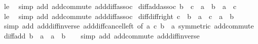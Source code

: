 \begin{isabellebody}
\ le\ \isamarkupfalse%
\ {\isacharparenleft}{\kern0pt}simp\ add{\isacharcolon}{\kern0pt}\ add{\isachardot}{\kern0pt}commute\ add{\isacharunderscore}{\kern0pt}diff{\isacharunderscore}{\kern0pt}assoc{\isacharparenright}{\kern0pt}%
\endisatagproof
{\isafoldproof}%
%
\isadelimproof
\isanewline
%
\endisadelimproof
\isanewline
{}\isamarkupfalse%
\ diff{\isacharunderscore}{\kern0pt}add{\isacharunderscore}{\kern0pt}assoc{}{\isacharcolon}{\kern0pt}\ {\isachardoublequoteopen}b\ {\isacharplus}{\kern0pt}\ c\ {\isacharminus}{\kern0pt}\ a\ {\isacharequal}{\kern0pt}\ b\ {\isacharminus}{\kern0pt}\ a\ {\isacharplus}{\kern0pt}\ c{\isachardoublequoteclose}\isanewline
%
\isadelimproof
\ \ %
\endisadelimproof
%
\isatagproof
{}\isamarkupfalse%
\ le\ \isamarkupfalse%
\ {\isacharparenleft}{\kern0pt}simp\ add{\isacharcolon}{\kern0pt}\ add{\isachardot}{\kern0pt}commute\ add{\isacharunderscore}{\kern0pt}diff{\isacharunderscore}{\kern0pt}assoc{\isacharparenright}{\kern0pt}%
\endisatagproof
{\isafoldproof}%
%
\isadelimproof
\isanewline
%
\endisadelimproof
\isanewline
{}\isamarkupfalse%
\ diff{\isacharunderscore}{\kern0pt}diff{\isacharunderscore}{\kern0pt}right{\isacharcolon}{\kern0pt}\ {\isachardoublequoteopen}c\ {\isacharminus}{\kern0pt}\ {\isacharparenleft}{\kern0pt}b\ {\isacharminus}{\kern0pt}\ a{\isacharparenright}{\kern0pt}\ {\isacharequal}{\kern0pt}\ c\ {\isacharplus}{\kern0pt}\ a\ {\isacharminus}{\kern0pt}\ b{\isachardoublequoteclose}\isanewline
%
\isadelimproof
\ \ %
\endisadelimproof
%
\isatagproof
{}\isamarkupfalse%
\ {\isacharparenleft}{\kern0pt}simp\ add{\isacharcolon}{\kern0pt}\ add{\isacharunderscore}{\kern0pt}diff{\isacharunderscore}{\kern0pt}inverse\ add{\isacharunderscore}{\kern0pt}diff{\isacharunderscore}{\kern0pt}cancel{\isacharunderscore}{\kern0pt}left\ {\isacharbrackleft}{\kern0pt}of\ a\ c\ {\isachardoublequoteopen}b\ {\isacharminus}{\kern0pt}\ a{\isachardoublequoteclose}{\isacharcomma}{\kern0pt}\ symmetric{\isacharbrackright}{\kern0pt}\ add{\isachardot}{\kern0pt}commute{\isacharparenright}{\kern0pt}%
\endisatagproof
{\isafoldproof}%
%
\isadelimproof
\isanewline
%
\endisadelimproof
\isanewline
{}\isamarkupfalse%
\ diff{\isacharunderscore}{\kern0pt}add{\isacharcolon}{\kern0pt}\ {\isachardoublequoteopen}b\ {\isacharminus}{\kern0pt}\ a\ {\isacharplus}{\kern0pt}\ a\ {\isacharequal}{\kern0pt}\ b{\isachardoublequoteclose}\isanewline
%
\isadelimproof
\ \ %
\endisadelimproof
%
\isatagproof
{}\isamarkupfalse%
\ {\isacharparenleft}{\kern0pt}simp\ add{\isacharcolon}{\kern0pt}\ add{\isachardot}{\kern0pt}commute\ add{\isacharunderscore}{\kern0pt}diff{\isacharunderscore}{\kern0pt}inverse{\isacharparenright}{\kern0pt}%

\end{isabellebody}
